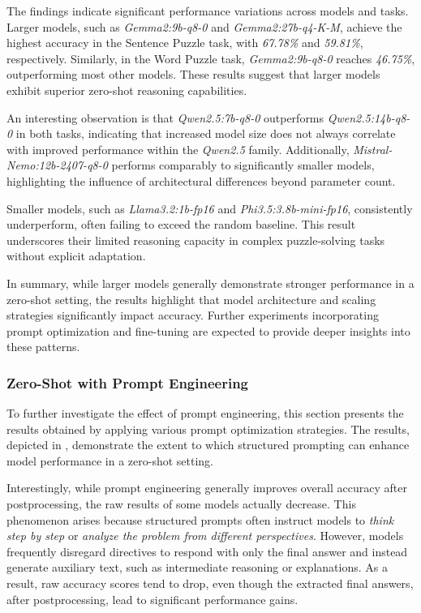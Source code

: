 The findings indicate significant performance variations across models and tasks. Larger models, such as \textit{Gemma2:9b-q8-0} and \textit{Gemma2:27b-q4-K-M}, achieve the highest accuracy in the Sentence Puzzle task, with \textit{67.78\%} and \textit{59.81\%}, respectively. Similarly, in the Word Puzzle task, \textit{Gemma2:9b-q8-0} reaches \textit{46.75\%}, outperforming most other models. These results suggest that larger models exhibit superior zero-shot reasoning capabilities.

An interesting observation is that \textit{Qwen2.5:7b-q8-0} outperforms \textit{Qwen2.5:14b-q8-0} in both tasks, indicating that increased model size does not always correlate with improved performance within the \textit{Qwen2.5} family. Additionally, \textit{Mistral-Nemo:12b-2407-q8-0} performs comparably to significantly smaller models, highlighting the influence of architectural differences beyond parameter count.

Smaller models, such as \textit{Llama3.2:1b-fp16} and \textit{Phi3.5:3.8b-mini-fp16}, consistently underperform, often failing to exceed the random baseline. This result underscores their limited reasoning capacity in complex puzzle-solving tasks without explicit adaptation.

In summary, while larger models generally demonstrate stronger performance in a zero-shot setting, the results highlight that model architecture and scaling strategies significantly impact accuracy. Further experiments incorporating prompt optimization and fine-tuning are expected to provide deeper insights into these patterns.

\subsubsection{Zero-Shot with Prompt Engineering}
To further investigate the effect of prompt engineering, this section presents the results obtained by applying various prompt optimization strategies. The results, depicted in , demonstrate the extent to which structured prompting can enhance model performance in a zero-shot setting.

Interestingly, while prompt engineering generally improves overall accuracy after postprocessing, the raw results of some models actually decrease. This phenomenon arises because structured prompts often instruct models to \textit{think step by step} or \textit{analyze the problem from different perspectives}. However, models frequently disregard directives to respond with only the final answer and instead generate auxiliary text, such as intermediate reasoning or explanations. As a result, raw accuracy scores tend to drop, even though the extracted final answers, after postprocessing, lead to significant performance gains.

